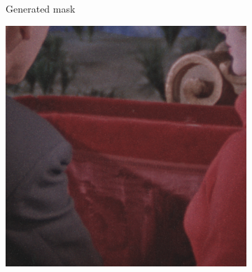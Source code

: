 \begin{figure}[H]
	\centering
	\begin{subfigure}{.3\textwidth}
		\centering
		\setlength{\fboxrule}{0.5pt}
        \setlength{\fboxsep}{0pt}
		\caption[figure]{Generated mask}
		\label{fig:flow_mask}
	\end{subfigure}
	\begin{subfigure}{.3\textwidth}
		\centering
		\includegraphics[width=\linewidth]{introduction/output.png}

\end{subfigure}
\end{figure}
